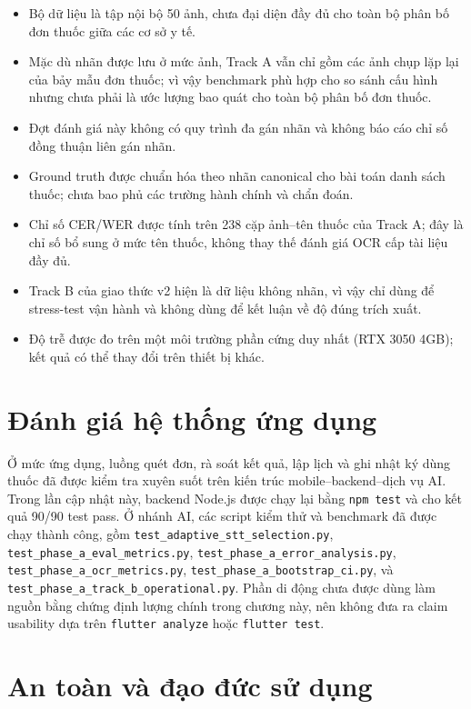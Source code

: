 \documentclass[12pt,a4paper]{report}
\begin{document}
\begin{itemize}[leftmargin=1.5cm]
    \item Bộ dữ liệu là tập nội bộ 50 ảnh, chưa đại diện đầy đủ cho toàn bộ phân bố đơn thuốc giữa các cơ sở y tế.
    \item Mặc dù nhãn được lưu ở mức ảnh, Track A vẫn chỉ gồm các ảnh chụp lặp lại của bảy mẫu đơn thuốc; vì vậy benchmark phù hợp cho so sánh cấu hình nhưng chưa phải là ước lượng bao quát cho toàn bộ phân bố đơn thuốc.
    \item Đợt đánh giá này không có quy trình đa gán nhãn và không báo cáo chỉ số đồng thuận liên gán nhãn.
    \item Ground truth được chuẩn hóa theo nhãn canonical cho bài toán danh sách thuốc; chưa bao phủ các trường hành chính và chẩn đoán.
    \item Chỉ số CER/WER được tính trên 238 cặp ảnh--tên thuốc của Track A; đây là chỉ số bổ sung ở mức tên thuốc, không thay thế đánh giá OCR cấp tài liệu đầy đủ.
    \item Track B của giao thức v2 hiện là dữ liệu không nhãn, vì vậy chỉ dùng để stress-test vận hành và không dùng để kết luận về độ đúng trích xuất.
    \item Độ trễ được đo trên một môi trường phần cứng duy nhất (RTX 3050 4GB); kết quả có thể thay đổi trên thiết bị khác.
\end{itemize}

\section{Đánh giá hệ thống ứng dụng}

Ở mức ứng dụng, luồng quét đơn, rà soát kết quả, lập lịch và ghi nhật ký dùng thuốc đã được kiểm tra xuyên suốt trên kiến trúc mobile--backend--dịch vụ AI. Trong lần cập nhật này, backend Node.js được chạy lại bằng \texttt{npm test} và cho kết quả 90/90 test pass. Ở nhánh AI, các script kiểm thử và benchmark đã được chạy thành công, gồm \texttt{test\_adaptive\_stt\_selection.py}, \texttt{test\_phase\_a\_eval\_metrics.py}, \texttt{test\_phase\_a\_error\_analysis.py}, \texttt{test\_phase\_a\_ocr\_metrics.py}, \texttt{test\_phase\_a\_bootstrap\_ci.py}, và \texttt{test\_phase\_a\_track\_b\_operational.py}. Phần di động chưa được dùng làm nguồn bằng chứng định lượng chính trong chương này, nên không đưa ra claim usability dựa trên \texttt{flutter analyze} hoặc \texttt{flutter test}.

\section{An toàn và đạo đức sử dụng}
\end{document}

